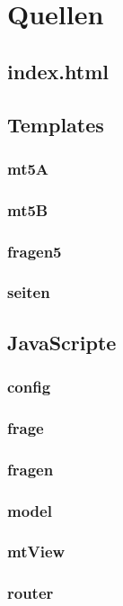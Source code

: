 \documentclass[a4paper]{scrartcl}
\begin{document}
		\section{Quellen}
			\subsection{index.html}
				
			\subsection{Templates}
				\subsubsection{mt5A}
					
				\subsubsection{mt5B}
					
				\subsubsection{fragen5}
					
				\subsubsection{seiten}
					
			\subsection{JavaScripte}
				\subsubsection{config}
					
				\subsubsection{frage}
					
				\subsubsection{fragen}
					
				\subsubsection{model}
					
				\subsubsection{mtView}
					
				\subsubsection{router}
					
\end{document}

